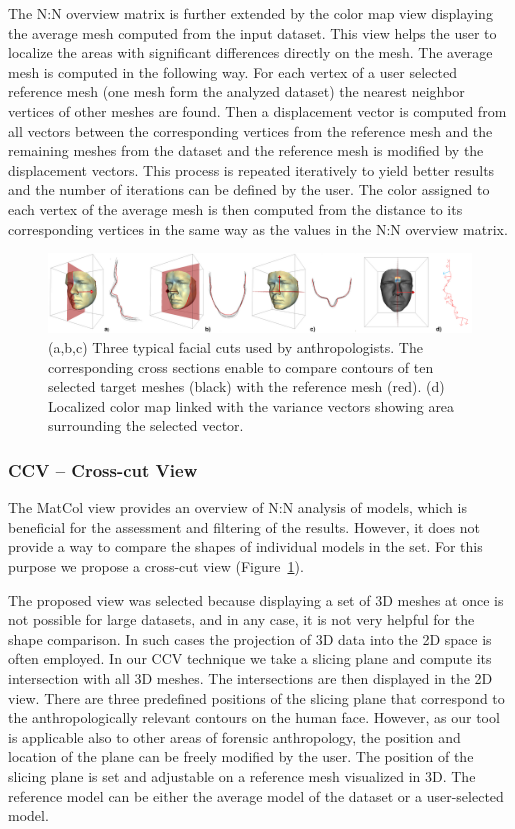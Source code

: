 \documentclass[final,5p,times]{elsarticle}
\begin{document}
The N:N overview matrix is further extended by the color map view displaying the average mesh computed from the input dataset. 
This view helps the user to localize the areas with significant differences directly on the mesh.
The average mesh is computed in the following way.
For each vertex of a user selected reference mesh (one mesh form the analyzed dataset) the nearest neighbor vertices of other meshes are found.
Then a displacement vector is computed from all vectors between the corresponding vertices from the reference mesh and the remaining meshes from the dataset and the reference mesh is modified by the displacement vectors.
This process is repeated iteratively to yield better results and the number of iterations can be defined by the user.
The color assigned to each vertex of the average mesh is then computed from the distance to its corresponding vertices in the same way as the values in the N:N overview matrix.

\begin{figure}[htb]
	\centering
  \includegraphics[width=0.9\linewidth]{pictures/cross.png}
  \caption{\label{fig:cross} (a,b,c) Three typical facial cuts used by anthropologists. The corresponding cross sections enable to compare contours of ten selected target meshes (black) with the reference mesh (red). (d) Localized color map linked with the variance vectors showing area surrounding the selected vector.}
\end{figure}

\subsubsection{CCV -- Cross-cut View}
The MatCol view provides an overview of N:N analysis of models, which is beneficial for the assessment and filtering of the results. 
However, it does not provide a way to compare the shapes of individual models in the set.
For this purpose we propose a cross-cut view (Figure~\ref{fig:cross}).

The proposed view was selected because displaying a set of 3D meshes at once is not possible for large datasets, and in any case, it is not very helpful for the shape comparison. 
In such cases the projection of 3D data into the 2D space is often employed.
In our CCV technique we take a slicing plane and compute its intersection with all 3D meshes.
The intersections are then displayed in the 2D view.
There are three predefined positions of the slicing plane that correspond to the anthropologically relevant contours on the human face. 
However, as our tool is applicable also to other areas of forensic anthropology, the position and location of the plane can be freely modified by the user.
The position of the slicing plane is set and adjustable on a reference mesh visualized in 3D.
The reference model can be either the average model of the dataset or a user-selected model.
\end{document}
